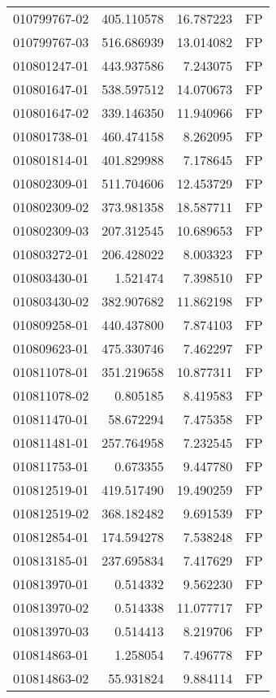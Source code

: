 \begin{tabular}{lrrl}
010799767-02 &  405.110578 &    16.787223 &   FP \\
010799767-03 &  516.686939 &    13.014082 &   FP \\
010801247-01 &  443.937586 &     7.243075 &   FP \\
010801647-01 &  538.597512 &    14.070673 &   FP \\
010801647-02 &  339.146350 &    11.940966 &   FP \\
010801738-01 &  460.474158 &     8.262095 &   FP \\
010801814-01 &  401.829988 &     7.178645 &   FP \\
010802309-01 &  511.704606 &    12.453729 &   FP \\
010802309-02 &  373.981358 &    18.587711 &   FP \\
010802309-03 &  207.312545 &    10.689653 &   FP \\
010803272-01 &  206.428022 &     8.003323 &   FP \\
010803430-01 &    1.521474 &     7.398510 &   FP \\
010803430-02 &  382.907682 &    11.862198 &   FP \\
010809258-01 &  440.437800 &     7.874103 &   FP \\
010809623-01 &  475.330746 &     7.462297 &   FP \\
010811078-01 &  351.219658 &    10.877311 &   FP \\
010811078-02 &    0.805185 &     8.419583 &   FP \\
010811470-01 &   58.672294 &     7.475358 &   FP \\
010811481-01 &  257.764958 &     7.232545 &   FP \\
010811753-01 &    0.673355 &     9.447780 &   FP \\
010812519-01 &  419.517490 &    19.490259 &   FP \\
010812519-02 &  368.182482 &     9.691539 &   FP \\
010812854-01 &  174.594278 &     7.538248 &   FP \\
010813185-01 &  237.695834 &     7.417629 &   FP \\
010813970-01 &    0.514332 &     9.562230 &   FP \\
010813970-02 &    0.514338 &    11.077717 &   FP \\
010813970-03 &    0.514413 &     8.219706 &   FP \\
010814863-01 &    1.258054 &     7.496778 &   FP \\
010814863-02 &   55.931824 &     9.884114 &   FP \\

\end{tabular}
